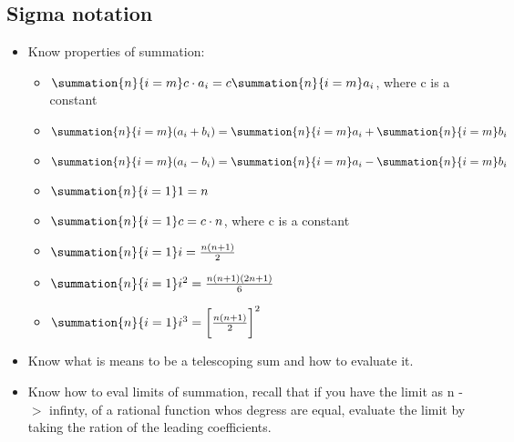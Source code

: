 \documentclass{report}
\begin{document}
    \subsection{Sigma notation}
    \bigbreak \noindent 
    \begin{itemize}
      \item Know properties of summation:
      \begin{itemize}
           \item $\summation{n}{i=m}c \cdot a_i = c\summation{n}{i=m} a_{i}$, where c is a constant
          \item $\summation{n}{i=m} (a_{i} + b_{i})= \summation{n}{i=m} a_{i} + \summation{n}{i=m} b_{i} $
          \item $\summation{n}{i=m} (a_{i} - b_{i})= \summation{n}{i=m} a_{i} - \summation{n}{i=m} b_{i} $
          \item $\summation{n}{i=1} 1=n $
          \item $\summation{n}{i=1} c=c \cdot n $, where c is a constant
          \item $\summation{n}{i=1} i= \frac{n(n+1)}{2} $
          \item $\summation{n}{i=1}i^{2} = \frac{n(n+1)(2n+1)}{6} $
          \item $\summation{n}{i=1}i^{3}=\bigg[\frac{n(n+1)}{2}\bigg]^{2} $
      \end{itemize}
      \item Know what is means to be a telescoping sum and how to evaluate it.
      \item Know how to eval limits of summation, recall that if you have the limit as n -$>$ infinty, of a rational function whos degress are equal, evaluate the limit
        by taking the ration of the leading coefficients.
    \end{itemize}

    \bigbreak \noindent \bigbreak \noindent 
\end{document}
